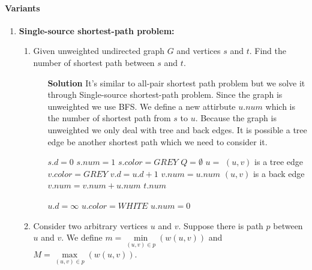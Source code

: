 \documentclass{book}
\begin{document}
	\paragraph{Variants}
	\begin{enumerate}
	\item \textbf{Single-source shortest-path problem:}
	\begin{enumerate}
		\item Given unweighted undirected graph $G$ and vertices $s$ and $t$. Find the number of shortest path between $s$ and $t$.
		\begin{itemize}
			\item[\textbf{Solution}] It's similar to all-pair shortest path problem but we solve it through Single-source shortest-path problem. Since the graph is unweighted we use BFS. We define a new attirbute $u.num$ which is the number of shortest path from $s$ to $u$. Because the graph is unweighted we only deal with tree and back edges. It is possible a tree edge be another shortest path which we need to consider it.
			\begin{algorithm*}[h!]
				\begin{algorithmic}[1]
						\State \Call{INIT-BFS}{G}
						\State $s.d = 0$
						\State $s.num = 1$
						\State $s.color = GREY$
						\State $Q = \emptyset$						
						\State {}
							\State $u = $ 
								 \Comment $(u, v)$ is a tree edge
									\State $v.color = GREY$
									\State $v.d = u.d + 1$
									\State $v.num = u.num$
									\State {}
								 \Comment $(u, v)$ is a back edge
									\State $v.num = v.num + u.num$
								\EndIf
							\EndFor
						\EndWhile
						\State \Return $t.num$
					\EndFunction
				\end{algorithmic}
			\end{algorithm*}
			\begin{algorithm*}[h!]
				\begin{algorithmic}
							\State $u.d = \infty$
							\State $u.color = WHITE$
							\State $u.num = 0$
						\EndFor
					\EndFunction
				\end{algorithmic}
			\end{algorithm*}
			\FloatBarrier
		\end{itemize}
		\item Consider two arbitrary vertices $u$ and $v$. Suppose there is path $p$ between $u$ and $v$. We define $m = \min\limits_{(u, v) \in p}(w(u, v))$ and $M = \max\limits_{(u, v) \in p}(w(u, v))$.

\end{enumerate}
\end{enumerate}
\end{document}
